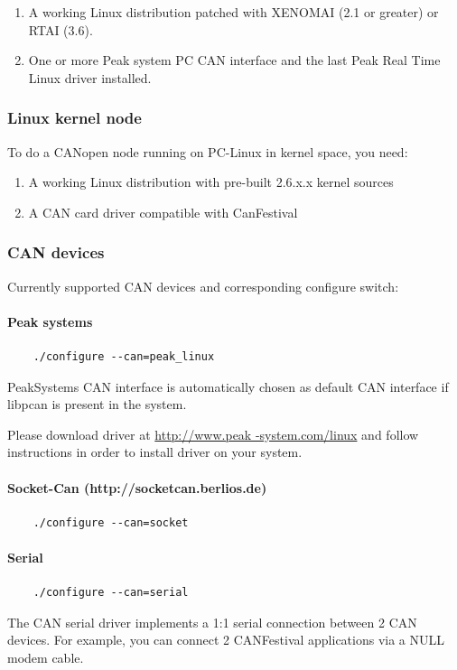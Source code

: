 \documentclass[12pt,english,a4paper]{book}
\begin{document}
\begin{enumerate}
\item A working Linux distribution patched with XENOMAI (2.1 or greater) or RTAI (3.6). 
\item One or more Peak system PC CAN interface and the last Peak Real Time
Linux driver installed. 
\end{enumerate}

\subsubsection{Linux kernel node}

To do a CANopen node running on PC-Linux in kernel space, you need:


\begin{enumerate}
\item A working Linux distribution with pre-built 2.6.x.x kernel sources
\item A CAN card driver compatible with CanFestival
\end{enumerate}


\subsubsection{CAN devices}
Currently supported CAN devices and corresponding configure switch:

\paragraph{Peak systems}
\begin{verbatim}
	./configure --can=peak_linux
\end{verbatim}
PeakSystems CAN interface is automatically chosen as default CAN interface
if libpcan is present in the system.

Please download driver at \href{http://www.peak-system.com/linux}{http://www.peak
-system.com/linux} and follow instructions in order to install driver
on your system.

\paragraph{Socket-Can (http://socketcan.berlios.de)}
\begin{verbatim}
	./configure --can=socket
\end{verbatim}

\paragraph{Serial}
\begin{verbatim}
	./configure --can=serial
\end{verbatim}
The CAN serial driver implements a 1:1 serial connection between 2 CAN devices.
For example, you can connect 2 CANFestival applications via a NULL modem cable.
\end{document}
